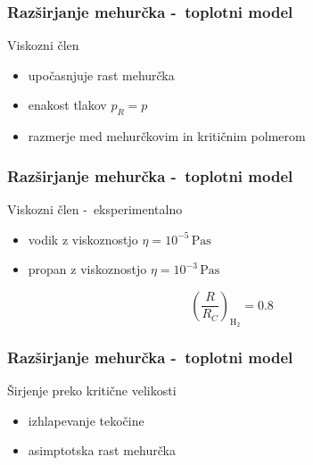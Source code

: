 \documentclass[14pt, t]{beamer}
\begin{document}
\begin{frame}
\frametitle{Razširjanje mehurčka -~toplotni model}
\begin{block}{Viskozni člen}
  \begin{itemize}
    \item <1-> upočasnjuje rast mehurčka
    \item <2-> enakost tlakov \( p_R = p \)
    \item <3-> razmerje med mehurčkovim in kritičnim polmerom
  \end{itemize}

\end{block}
\end{frame}

\begin{frame}
\frametitle{Razširjanje mehurčka -~toplotni model}
\begin{block}{Viskozni člen -~eksperimentalno}
\begin{itemize}
  \item <1-> vodik z viskoznostjo \( \eta = 10^{-5} \, \mathrm{Pas} \)
  \item <2-> propan z viskoznostjo \( \eta = 10^{-3} \, \mathrm{Pas} \)
\end{itemize}
\end{block}
\[ \left(\frac{R}{R_C}\right)_{\mathrm{H}_2} = 0.8 
\]

\end{frame}

\begin{frame}
\frametitle{Razširjanje mehurčka -~toplotni model}
\begin{block}{Širjenje preko kritične velikosti}
  \begin{itemize}
    \item<1-> izhlapevanje tekočine
    \item <2-> asimptotska rast mehurčka
  \end{itemize}
\end{block}
\end{frame}
\end{document}
